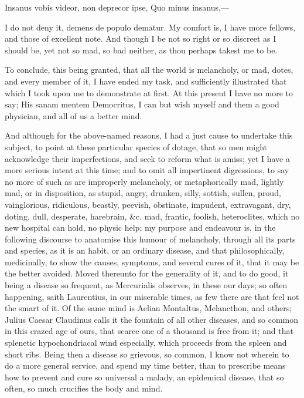 {Insanus vobis videor, non deprecor ipse,
Quo minus insanus,---

I do not deny it, demens de populo dematur. My comfort is, I have more
fellows, and those of excellent note. And though I be not so right or
so discreet as I should be, yet not so mad, so bad neither, as thou
perhaps takest me to be.

To conclude, this being granted, that all the world is melancholy, or
mad, dotes, and every member of it, I have ended my task, and
sufficiently illustrated that which I took upon me to demonstrate at
first. At this present I have no more to say; His sanam mentem
Democritus, I can but wish myself and them a good physician, and all of
us a better mind.

And although for the above-named reasons, I had a just cause to
undertake this subject, to point at these particular species of dotage,
that so men might acknowledge their imperfections, and seek to reform
what is amiss; yet I have a more serious intent at this time; and to
omit all impertinent digressions, to say no more of such as are
improperly melancholy, or metaphorically mad, lightly mad, or in
disposition, as stupid, angry, drunken, silly, sottish, sullen, proud,
vainglorious, ridiculous, beastly, peevish, obstinate, impudent,
extravagant, dry, doting, dull, desperate, harebrain, \&c. mad, frantic,
foolish, heteroclites, which no new  hospital can hold, no physic
help; my purpose and endeavour is, in the following discourse to
anatomise this humour of melancholy, through all its parts and species,
as it is an habit, or an ordinary disease, and that philosophically,
medicinally, to show the causes, symptoms, and several cures of it,
that it may be the better avoided. Moved thereunto for the generality
of it, and to do good, it being a disease so frequent, as 
Mercurialis observes, in these our days; so often happening, saith
 Laurentius, in our miserable times, as few there are that feel
not the smart of it. Of the same mind is Aelian Montaltus,
Melancthon, and others; Julius Caesar Claudinus calls it the
fountain of all other diseases, and so common in this crazed age of
ours, that scarce one of a thousand is free from it; and that splenetic
hypochondriacal wind especially, which proceeds from the spleen and
short ribs. Being then a disease so grievous, so common, I know not
wherein to do a more general service, and spend my time better, than to
prescribe means how to prevent and cure so universal a malady, an
epidemical disease, that so often, so much crucifies the body and mind.

}
